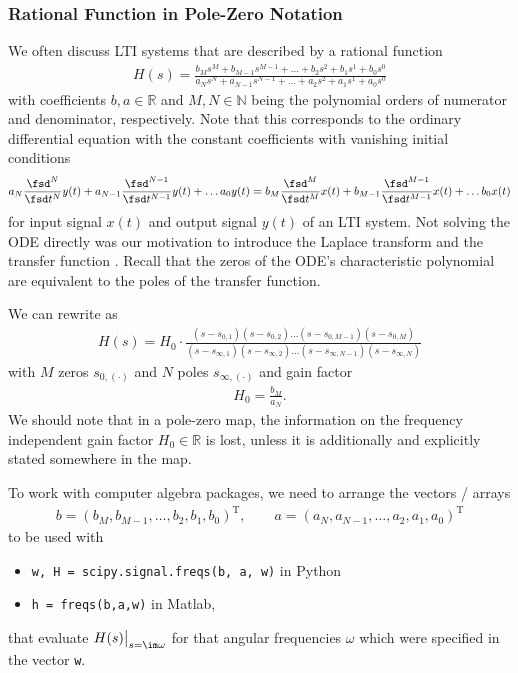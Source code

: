 \subsubsection{Rational Function in Pole-Zero Notation}
We often discuss LTI systems that are described by a rational function
\begin{align}
\label{eq:Hs_b_a}
H(s) = \frac
{b_M s^M + b_{M-1} s^{M-1} + \dots + b_2 s^2 + b_1 s^1 + b_0 s^0}
{a_N s^N + a_{N-1} s^{N-1} + \dots + a_2 s^2 + a_1 s^1 + a_0 s^0}
\end{align}
with coefficients $b,a \in \mathbb{R}$ and $M,N \in \mathbb{N}$ being the
polynomial orders of numerator and denominator, respectively.
%
Note that this corresponds to the ordinary differential equation with the
constant coefficients with vanishing initial conditions
\begin{align}
a_N \frac{\fsd^N}{\fsd t^N}y(t) + a_{N-1} \frac{\fsd^{N-1}}{\fsd t^{N-1}}y(t) + \dots a_0 y(t)=
b_M \frac{\fsd^M}{\fsd t^M}x(t) + b_{M-1} \frac{\fsd^{M-1}}{\fsd t^{M-1}}x(t) + \dots b_0 x(t)
\end{align}
for input signal $x(t)$ and output signal $y(t)$ of an LTI system.
%
Not solving the ODE directly was our motivation to introduce the Laplace transform
and the transfer function .
Recall that the zeros of the ODE's characteristic polynomial are equivalent to
the poles of the transfer function.
%

We can rewrite  as
\begin{align}
\label{eq:Hs_H0_z_p}
H(s) = H_0 \cdot \frac
{(s-s_{0,1}) (s-s_{0,2}) \dots (s-s_{0,M-1}) (s-s_{0,M})}
{(s-s_{\infty,1}) (s-s_{\infty,2}) \dots (s-s_{\infty,N-1}) (s-s_{\infty,N})}
\end{align}
with $M$ zeros $s_{0,(\cdot)}$ and $N$ poles $s_{\infty,(\cdot)}$
and gain factor
\begin{align}
H_0 = \frac{b_M}{a_N}.
\end{align}
%
We should note that in a pole-zero map, the information on the frequency
independent gain factor $H_0 \in \mathbb{R}$ is lost, unless it is additionally
and explicitly stated somewhere in the map.

To work with computer algebra packages, we need to arrange the vectors / arrays
\begin{align}
b = (b_M, b_{M-1}, \dots, b_2, b_1, b_0)^\mathrm{T}, \qquad
a = (a_N, a_{N-1}, \dots, a_2, a_1, a_0)^\mathrm{T}
\end{align}
to be used with
\begin{itemize}
  \item \verb|w, H = scipy.signal.freqs(b, a, w)| in Python
  \item \verb|h = freqs(b,a,w)| in Matlab,
\end{itemize}
that evaluate $H(s)\big|_{s=\im\omega}$ for that
angular frequencies $\omega$ which were specified in the vector \verb|w|.



